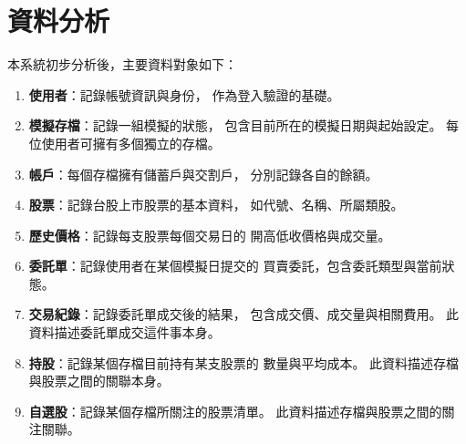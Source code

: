 \documentclass[UTF8, a4paper, 12pt, fontset=none]{ctexart}
\begin{document}

    \section{資料分析}
    本系統初步分析後，主要資料對象如下：

    \begin{enumerate}
        \item \textbf{使用者}：記錄帳號資訊與身份，
        作為登入驗證的基礎。

        \item \textbf{模擬存檔}：記錄一組模擬的狀態，
        包含目前所在的模擬日期與起始設定。
        每位使用者可擁有多個獨立的存檔。

        \item \textbf{帳戶}：每個存檔擁有儲蓄戶與交割戶，
        分別記錄各自的餘額。

        \item \textbf{股票}：記錄台股上市股票的基本資料，
        如代號、名稱、所屬類股。

        \item \textbf{歷史價格}：記錄每支股票每個交易日的
        開高低收價格與成交量。

        \item \textbf{委託單}：記錄使用者在某個模擬日提交的
        買賣委託，包含委託類型與當前狀態。

        \item \textbf{交易紀錄}：記錄委託單成交後的結果，
        包含成交價、成交量與相關費用。
        此資料描述委託單成交這件事本身。

        \item \textbf{持股}：記錄某個存檔目前持有某支股票的
        數量與平均成本。
        此資料描述存檔與股票之間的關聯本身。

        \item \textbf{自選股}：記錄某個存檔所關注的股票清單。
        此資料描述存檔與股票之間的關注關聯。
        
    \end{enumerate}
\end{document}
